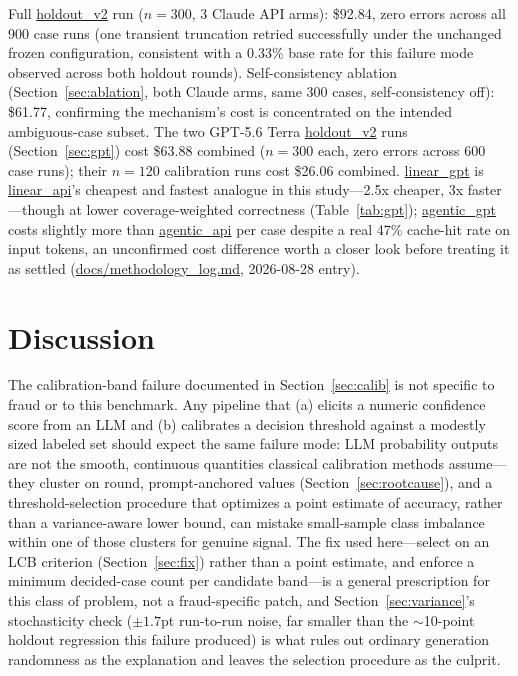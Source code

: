 \documentclass[]{ieeeaccess}
\newcommand{\code}[1]{\url{#1}}
\begin{document}
Full \code{holdout_v2} run ($n=300$, 3 Claude API arms): \$92.84, zero
errors across all 900 case runs (one transient truncation retried
successfully under the unchanged frozen configuration, consistent with a
0.33\% base rate for this failure mode observed across both holdout
rounds). Self-consistency ablation (Section~\ref{sec:ablation}, both Claude arms, same
300 cases, self-consistency off): \$61.77, confirming the mechanism's
cost is concentrated on the intended ambiguous-case subset. The two
GPT-5.6 Terra \code{holdout_v2} runs (Section~\ref{sec:gpt}) cost \$63.88
combined ($n=300$ each, zero errors across 600 case runs); their $n=120$
calibration runs cost \$26.06 combined. \code{linear_gpt} is
\code{linear_api}'s cheapest and fastest analogue in this study---2.5x
cheaper, 3x faster---though at lower coverage-weighted correctness
(Table~\ref{tab:gpt}); \code{agentic_gpt} costs slightly more than \code{agentic_api}
per case despite a real 47\% cache-hit rate on input tokens, an
unconfirmed cost difference worth a closer look before treating it as
settled (\code{docs/methodology_log.md}, 2026-08-28 entry).

\section{Discussion}\label{sec:discussion}

The calibration-band failure documented in Section~\ref{sec:calib} is not specific to
fraud or to this benchmark. Any pipeline that (a) elicits a numeric
confidence score from an LLM and (b) calibrates a decision threshold
against a modestly sized labeled set should expect the same failure
mode: LLM probability outputs are not the smooth, continuous quantities
classical calibration methods assume---they cluster on round,
prompt-anchored values (Section~\ref{sec:rootcause}), and a threshold-selection procedure
that optimizes a point estimate of accuracy, rather than a variance-aware
lower bound, can mistake small-sample class imbalance within one of
those clusters for genuine signal. The fix used here---select on an LCB
criterion (Section~\ref{sec:fix}) rather than a point estimate, and enforce a
minimum decided-case count per candidate band---is a general
prescription for this class of problem, not a fraud-specific patch, and
Section~\ref{sec:variance}'s stochasticity check ($\pm 1.7$pt run-to-run noise, far
smaller than the $\sim$10-point holdout regression this failure
produced) is what rules out ordinary generation randomness as the
explanation and leaves the selection procedure as the culprit.
\end{document}
